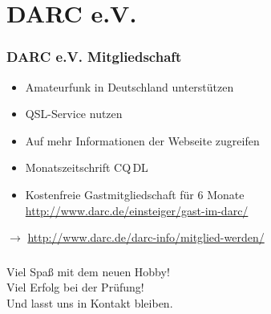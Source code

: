 \section{DARC e.V.}
\begin{frame}
  \frametitle{DARC e.V. Mitgliedschaft}
  \begin{itemize}
    \item Amateurfunk in Deutschland unterstützen
    \item QSL-Service nutzen
    \item Auf mehr Informationen der Webseite zugreifen
    \item Monatszeitschrift CQ\,DL
    \item Kostenfreie Gastmitgliedschaft für 6 Monate \url{http://www.darc.de/einsteiger/gast-im-darc/}
  \end{itemize}
  \vspace{1.5em}
  $\rightarrow$ \url{http://www.darc.de/darc-info/mitglied-werden/}
\end{frame}

\begin{frame}
  \frametitle{\checkmark}
  \begin{center}
    {\Huge Viel Spaß mit dem neuen Hobby!}\\[.5em]
    {\Huge Viel Erfolg bei der Prüfung!}\\[.5em]
    Und lasst uns in Kontakt bleiben.
  \end{center}
\end{frame}


